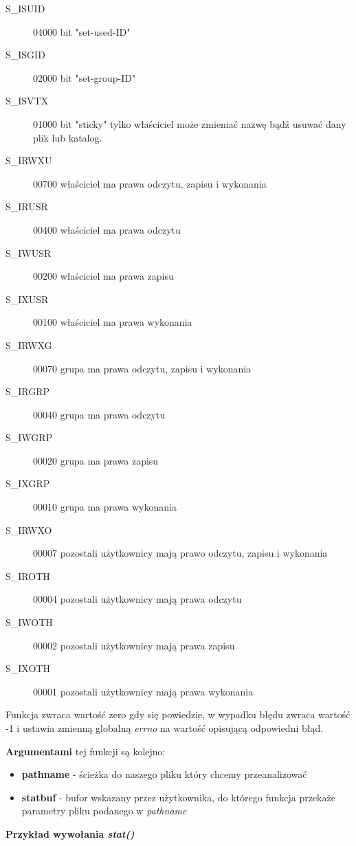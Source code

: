 \documentclass{article}
\begin{document}
\begin{description}

\item[S\_ISUID]	04000	bit "set-used-ID"
\item[S\_ISGID]	02000	bit "set-group-ID" 
\item[S\_ISVTX]	01000	bit "sticky" tylko właściciel może zmieniać nazwę bądź usuwać dany plik lub katalog.
\item[S\_IRWXU]	00700	właściciel ma prawa odczytu, zapisu i wykonania
\item[S\_IRUSR]	00400	właściciel ma prawa odczytu
\item[S\_IWUSR]	00200	właściciel ma prawa zapisu
\item[S\_IXUSR]	00100	właściciel ma prawa wykonania
\item[S\_IRWXG]	00070	grupa ma prawa odczytu, zapisu i wykonania
\item[S\_IRGRP]	00040	grupa ma prawa odczytu
\item[S\_IWGRP]	00020	grupa ma prawa zapisu
\item[S\_IXGRP]	00010	grupa ma prawa wykonania
\item[S\_IRWXO]	00007	pozostali użytkownicy mają prawo odczytu, zapisu i wykonania
\item[S\_IROTH]	00004	pozostali użytkownicy mają prawa odczytu
\item[S\_IWOTH]	00002	pozostali użytkownicy mają prawa zapisu
\item[S\_IXOTH]	00001	pozostali użytkownicy mają prawa wykonania
\end{description}

Funkcja zwraca wartość zero gdy się powiedzie, w wypadku błędu zwraca wartość -1 i ustawia zmienną globalną \textit{errno} na wartość opisującą odpowiedni błąd.

\textbf{Argumentami} tej funkcji są kolejno:
\begin{itemize}
\item \textbf{pathname} - ścieżka do naszego pliku który chcemy przeanalizować
\item \textbf{statbuf} - bufor wskazany przez użytkownika, do którego funkcja przekaże parametry pliku podanego w \textit{pathname}
\end{itemize}


\textbf{Przykład wywołania \textit{stat()}}
\end{document}
